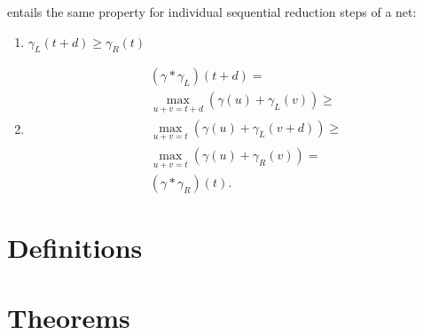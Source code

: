 \documentclass{fit-teorsem}
\begin{document}
\begin{itemize}
\begin{description}
				entails the same property for individual sequential reduction steps of a net:
				\begin{enumerate}
					\item $\gamma_L (t + d) \ge \gamma_R (t)$
					\item \begin{align*}
							& (\gamma \ast \gamma_L) (t + d) = \\
							& \max_{u + v = t + d} (\gamma(u) + \gamma_L(v)) \ge \\
							& \max_{u + v = t} (\gamma(u) + \gamma_L(v + d)) \ge \\
							& \max_{u + v = t} (\gamma(u) + \gamma_R(v)) = \\
							& (\gamma \ast \gamma_R)(t)
						.\end{align*}
				\end{enumerate}
		\end{description}
\end{itemize}

\section*{Definitions}

\section*{Theorems}
\end{document}
